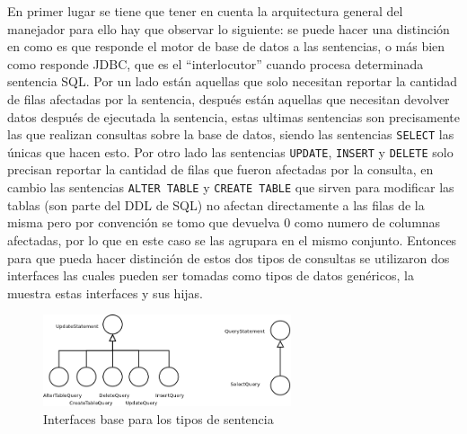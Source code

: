 En primer lugar se tiene que tener en cuenta la arquitectura general del manejador para ello hay que observar lo siguiente: se puede hacer una distinción en como es que responde el motor de base de datos a las sentencias, o más bien como responde JDBC, que es el ``interlocutor'' cuando procesa determinada sentencia SQL. Por un lado están aquellas que solo necesitan reportar la cantidad de filas afectadas por la sentencia, después están aquellas que necesitan devolver datos después de ejecutada la sentencia, estas ultimas sentencias son precisamente las que realizan consultas sobre la base de datos, siendo las sentencias \verb=SELECT= las únicas que hacen esto. Por otro lado las sentencias \verb=UPDATE=, \verb=INSERT= y \verb=DELETE= solo precisan reportar la cantidad de filas que fueron afectadas por la consulta, en cambio las sentencias \verb=ALTER TABLE= y \verb=CREATE TABLE= que sirven para modificar las tablas (son parte del DDL de SQL) no afectan directamente a las filas de la misma pero por convención se tomo que \jd devuelva 0 como numero de columnas afectadas, por lo que en este caso se las agrupara en el mismo conjunto. Entonces para que \jj pueda hacer distinción de estos dos tipos de consultas se utilizaron dos interfaces las cuales pueden ser tomadas como tipos de datos genéricos, la  muestra estas interfaces y sus hijas.
%
\begin{figure}[h]
  \centering
    \includegraphics[width=0.65\textwidth]{figuras/crossdb-base.png}
  \caption{Interfaces base para los tipos de sentencia}
  \label{fig:crossdb-base}
\end{figure}

